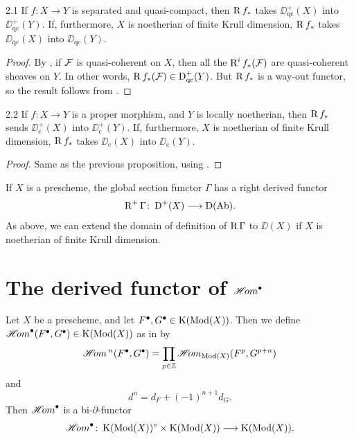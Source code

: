 \begin{bookproposition}{2.1}\label{prop:2.2.1}
If $f\colon X\to Y$ is separated and quasi-compact, then $\operatorname{R} f_*$ takes $\DD_{\mathrm{qc}}^+(X)$ into $\DD_{\mathrm{qc}}^+(Y)$. If, furthermore, $X$ is noetherian of finite Krull dimension, $\operatorname{R} f_*$ takes $\DD_{\mathrm{qc}}(X)$ into $\DD_{\mathrm{qc}}(Y)$.
\end{bookproposition}

\begin{proof}
By \cite[\nopp III,~1.4.10]{EGA}, if $\mathcal{F}$ is quasi-coherent on $X$, then all the $\operatorname{R}^if_*(\mathcal{F})$ are quasi-coherent sheaves on $Y$. In other words, $\operatorname{R} f_*(\mathcal{F})\in\operatorname{D}_{\mathrm{qc}}^+(Y)$. But $\operatorname{R} f_*$ is a way-out functor, so the result follows from .
\end{proof}

\begin{bookproposition}{2.2}\label{prop:2.2.2}
If $f\colon X\to Y$ is a proper morphism, and $Y$ is locally noetherian, then $\operatorname{R} f_*$ sends $\DD_{\mathrm{c}}^+(X)$ into $\DD_{\mathrm{c}}^+(Y)$. If, furthermore, $X$ is noetherian of finite Krull dimension, $\operatorname{R} f_*$ takes $\DD_{\mathrm{c}}(X)$ into $\DD_{\mathrm{c}}(Y)$.
\end{bookproposition}

\begin{proof}
Same as the previous proposition, using \cite[\nopp III,~3.2.1]{EGA}.
\end{proof}

If $X$ is a prescheme, the global section functor $\Gamma$ has a right derived functor
\[
\operatorname{R}^+\Gamma\colon \operatorname{D}^+(X) \longrightarrow \operatorname{D}(\operatorname{Ab}).
\]
As above, we can extend the domain of definition of $\operatorname{R}\Gamma$ to $\DD(X)$ if $X$ is noetherian of finite Krull dimension.
\section{The derived functor of $\mathop{\mathscr{H}\!om}\nolimits^\bullet$}\label{sec:2.3}

\begingroup\setlength{\emergencystretch}{2em}
Let $X$ be a prescheme, and let $F^\bullet,G^\bullet\in\operatorname{K}(\operatorname{Mod}(X))$. Then we define $\mathop{\mathscr{H}\!om}\nolimits^\bullet(F^\bullet,G^\bullet)\in\operatorname{K}(\operatorname{Mod}(X))$ as in  by
\[
\mathop{\mathscr{H}\!om}\nolimits{}^n(F^\bullet,G^\bullet) = \prod_{p\in\mathbb{Z}} \mathop{\mathscr{H}\!om}\nolimits_{\operatorname{Mod}(X)}(F^p, G^{p+n})
\]
and
\[
d^n = d_F + (-1)^{n+1} d_G.
\]
Then $\mathop{\mathscr{H}\!om}\nolimits^\bullet$ is a bi-$\partial$-functor
\[
\mathop{\mathscr{H}\!om}\nolimits^\bullet\colon \operatorname{K}(\operatorname{Mod}(X))^\circ \times \operatorname{K}(\operatorname{Mod}(X)) \longrightarrow \operatorname{K}(\operatorname{Mod}(X)).
\]\par\endgroup

